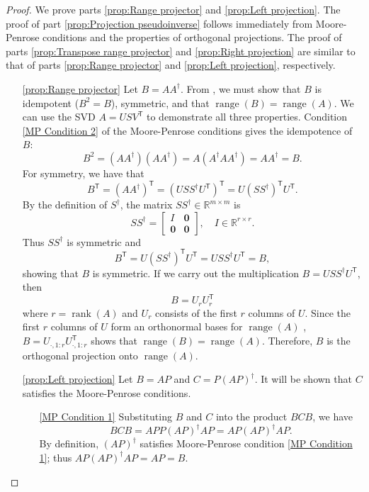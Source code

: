 \documentclass[12pt]{article}
\newcommand{\trans}[1]{{#1}^\mathsf{T}}	%
\newcommand{\pinv}[1]{{#1}^\dagger}	%
\DeclareMathOperator{\rank}{rank}	%
\DeclareMathOperator{\range}{range}	%
\newcommand{\zeroVec}{\bm{0}}	%
\begin{document}
\begin{proof}
We prove parts \ref{prop:Range projector} and \ref{prop:Left projection}. The proof of part \ref{prop:Projection pseudoinverse} follows immediately from Moore-Penrose conditions and the properties of orthogonal projections. The proof of parts \ref{prop:Transpose range projector} and \ref{prop:Right projection} are similar to that of parts \ref{prop:Range projector} and \ref{prop:Left projection}, respectively. 
\begin{enumerate}
    \item[\ref{prop:Range projector}] Let $B = A\pinv{A}$.  From \cite[p.~82]{GolubVanLoan2013}, we must show that $B$ is idempotent ($B^2 = B$), symmetric, and that $\range(B) = \range(A)$. We can use the SVD $A = US\trans{V}$ to demonstrate all three properties. Condition \ref{MP Condition 2} of the Moore-Penrose conditions gives the idempotence of $B$:
    \[B^2 = \left(A\pinv{A}\right)\left(A\pinv{A}\right) = A\left(\pinv{A}A\pinv{A}\right) = A\pinv{A} = B.\]
    For symmetry, we have that
    \[\trans{B} = \trans{\left(A\pinv{A}\right)} = \trans{\left(US\pinv{S}\trans{U}\right)} = U\trans{\left(S\pinv{S}\right)}\trans{U}.\]
    By the definition of $\pinv{S}$, the matrix $S\pinv{S} \in \mathbb{R}^{m \times m}$ is
    \[S\pinv{S} = \begin{bmatrix}
    I & \zeroVec \\
    \zeroVec & \zeroVec
    \end{bmatrix}, \quad I \in \mathbb{R}^{r \times r}.\]
    Thus $S\pinv{S}$ is symmetric and 
    \[\trans{B} = U\trans{\left(S\pinv{S}\right)}\trans{U} = US\pinv{S}\trans{U} = B,\]
    showing that $B$ is symmetric. If we carry out the multiplication $B = US\pinv{S}\trans{U}$, then
    \[B = U_{r}\trans{U}_{r}\]
    where $r = \rank(A)$ and $U_r$ consists of the first $r$ columns of $U$. Since the first $r$ columns of $U$ form an orthonormal bases for $\range(A)$ \cite[p.~340]{Leon2010}, $B = U_{\cdot,1:r}\trans{U}_{\cdot,1:r}$ shows that $\range(B) = \range(A)$. Therefore, $B$ is the orthogonal projection onto $\range(A)$.
    \item[\ref{prop:Left projection}] Let $B = AP$ and $C = P\pinv{\left(AP\right)}$. It will be shown that $C$ satisfies the Moore-Penrose conditions.
    \begin{enumerate}
        \item[\ref{MP Condition 1}] Substituting $B$ and $C$ into the product $BCB$, we have 
        \[BCB = APP\pinv{\left(AP\right)}AP = AP\pinv{\left(AP\right)}AP.\] 
        By definition, $\pinv{\left(AP\right)}$ satisfies Moore-Penrose condition \ref{MP Condition 1}; thus $AP\pinv{\left(AP\right)}AP = AP = B$.

\end{enumerate}
\end{enumerate}
\end{proof}
\end{document}
